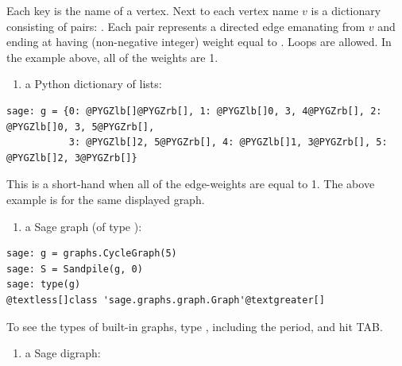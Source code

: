 \documentclass[letterpaper,10pt,english]{manual}
\begin{document}
Each key is the name of a vertex.  Next to each vertex name $v$ is a dictionary
consisting of pairs: .  Each pair represents a directed edge
emanating from $v$ and ending at  having (non-negative integer) weight
equal to .  Loops are allowed. In the example above, all of the weights are 1.
\begin{enumerate}
\item {} 
a Python dictionary of lists:

\end{enumerate}

\begin{Verbatim}[commandchars=@\[\]]
sage: g = {0: @PYGZlb[]@PYGZrb[], 1: @PYGZlb[]0, 3, 4@PYGZrb[], 2: @PYGZlb[]0, 3, 5@PYGZrb[],
           3: @PYGZlb[]2, 5@PYGZrb[], 4: @PYGZlb[]1, 3@PYGZrb[], 5: @PYGZlb[]2, 3@PYGZrb[]}
\end{Verbatim}

This is a short-hand when all of the edge-weights are equal to 1.  The above
example is for the same displayed graph.
\begin{enumerate}
\item {} 
a Sage graph (of type ):

\end{enumerate}

\begin{Verbatim}[commandchars=@\[\]]
sage: g = graphs.CycleGraph(5)
sage: S = Sandpile(g, 0)
sage: type(g)
@textless[]class 'sage.graphs.graph.Graph'@textgreater[]
\end{Verbatim}

To see the types of built-in graphs, type , including the period,
and hit TAB.
\begin{enumerate}
\item {} 
a Sage digraph:

\end{enumerate}
\end{document}
